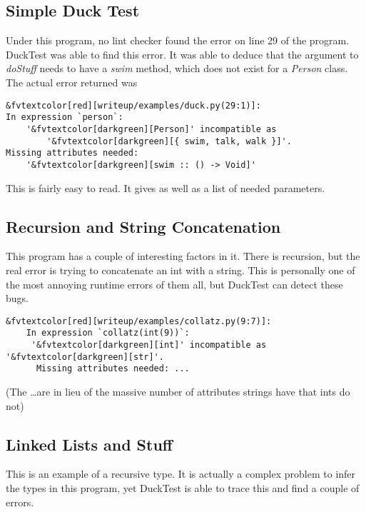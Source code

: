 \documentclass{scrartcl}
\begin{document}
\begin{multicols}{2}
\subsection*{Simple Duck Test}

Under this program, no lint checker found the error
on line 29 of the program. DuckTest was able to find
this error. It was able to deduce that the argument
to \emph{doStuff} needs to have a \emph{swim} method,
which does not exist for a \emph{Person} class. The actual
error returned was
\begin{Verbatim}[commandchars=&\[\]]
&fvtextcolor[red][writeup/examples/duck.py(29:1)]:
In expression `person`:
    '&fvtextcolor[darkgreen][Person]' incompatible as
        '&fvtextcolor[darkgreen][{ swim, talk, walk }]'.
Missing attributes needed:
    '&fvtextcolor[darkgreen][swim :: () -> Void]'
\end{Verbatim}
This is fairly easy to read. It gives as well as a list of
needed parameters.

\subsection*{Recursion and String Concatenation}


This program has a couple of interesting factors in it.
There is recursion, but the real error is trying to concatenate
an int with a string. This is personally one of the most annoying
runtime errors of them all, but DuckTest can detect these bugs.


\begin{Verbatim}[commandchars=&\[\]]
&fvtextcolor[red][writeup/examples/collatz.py(9:7)]:
    In expression `collatz(int(9))`:
     '&fvtextcolor[darkgreen][int]' incompatible as '&fvtextcolor[darkgreen][str]'.
      Missing attributes needed: ...
\end{Verbatim}

{\footnotesize{(The \ldots are in lieu of the massive number of attributes strings have that ints do not)}}

\subsection*{Linked Lists and Stuff}


This is an example of a recursive type. It is actually a complex problem
to infer the types in this program, yet DuckTest is able to trace this and
find a couple of errors.


\end{multicols}
\end{document}
